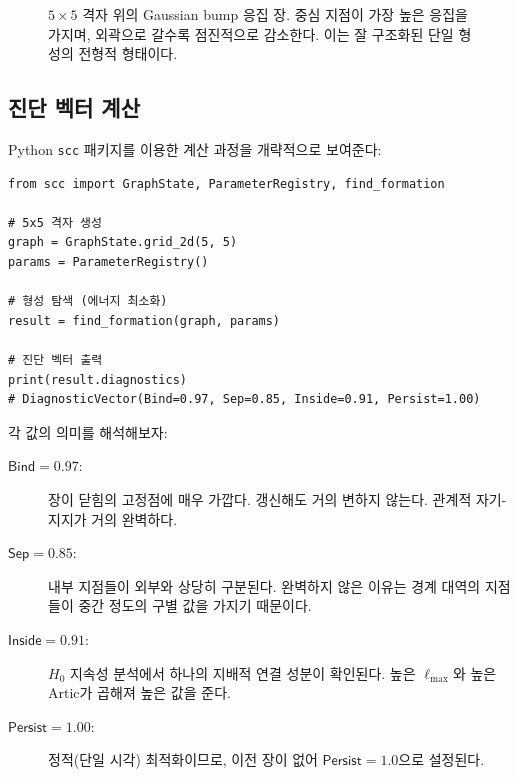 \begin{figure}[t]
\centering
\caption{$5 \times 5$ 격자 위의 Gaussian bump 응집 장. 중심 지점이 가장 높은 응집을 가지며, 외곽으로 갈수록 점진적으로 감소한다. 이는 잘 구조화된 단일 형성의 전형적 형태이다.}
\label{fig:gaussian-5x5}
\end{figure}


\subsection{진단 벡터 계산}

Python \texttt{scc} 패키지를 이용한 계산 과정을 개략적으로 보여준다:

\begin{verbatim}
from scc import GraphState, ParameterRegistry, find_formation

# 5x5 격자 생성
graph = GraphState.grid_2d(5, 5)
params = ParameterRegistry()

# 형성 탐색 (에너지 최소화)
result = find_formation(graph, params)

# 진단 벡터 출력
print(result.diagnostics)
# DiagnosticVector(Bind=0.97, Sep=0.85, Inside=0.91, Persist=1.00)
\end{verbatim}

각 값의 의미를 해석해보자:

\begin{description}
    \item[$\mathsf{Bind} = 0.97$:] 장이 닫힘의 고정점에 매우 가깝다. 갱신해도 거의 변하지 않는다. 관계적 자기-지지가 거의 완벽하다.

    \item[$\mathsf{Sep} = 0.85$:] 내부 지점들이 외부와 상당히 구분된다. 완벽하지 않은 이유는 경계 대역의 지점들이 중간 정도의 구별 값을 가지기 때문이다.

    \item[$\mathsf{Inside} = 0.91$:] $H_0$ 지속성 분석에서 하나의 지배적 연결 성분이 확인된다. 높은 $\ell_{\max}$와 높은 $\mathrm{Artic}$가 곱해져 높은 값을 준다.

    \item[$\mathsf{Persist} = 1.00$:] 정적(단일 시각) 최적화이므로, 이전 장이 없어 $\mathsf{Persist} = 1.0$으로 설정된다.
\end{description}

